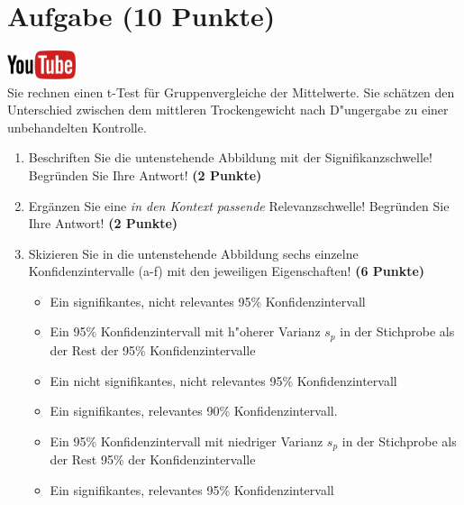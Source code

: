 \documentclass[a4paper, 9pt]{scrartcl}\usepackage[]{graphicx}\usepackage[]{xcolor}
\begin{document}
 
\clearpage

\section{Aufgabe \hfill (10 Punkte)}

\hfill\href{https://youtu.be/CN_O4fYPbhs}{\includegraphics[width =
  2cm]{img/youtube}}\\[1Ex]



Sie rechnen einen t-Test f{\"u}r Gruppenvergleiche der Mittelwerte. Sie
sch{\"a}tzen den Unterschied zwischen dem mittleren Trockengewicht nach D{"u}ngergabe zu einer unbehandelten
Kontrolle.

\begin{enumerate}
\item Beschriften Sie die untenstehende Abbildung mit der
  Signifikanzschwelle! Begr{\"u}nden Sie Ihre Antwort! \textbf{(2 Punkte)}
\item Erg{\"a}nzen Sie eine \textit{in den Kontext passende} Relevanzschwelle!
  Begr{\"u}nden Sie Ihre Antwort! \textbf{(2 Punkte)} 
\item Skizieren Sie in die
  untenstehende Abbildung sechs einzelne Konfidenzintervalle (a-f) mit den
  jeweiligen Eigenschaften! \textbf{(6 Punkte)}
  \begin{itemize}
  \item[(a)] Ein signifikantes, nicht relevantes 95\% Konfidenzintervall 	
  \item[(b)] Ein 95\% Konfidenzintervall mit h{"o}herer Varianz $s_p$ in der Stichprobe als der Rest der 95\% Konfidenzintervalle 	
  \item[(c)] Ein nicht signifikantes, nicht relevantes 95\% Konfidenzintervall 	
  \item[(d)] Ein signifikantes, relevantes 90\% Konfidenzintervall. 
  \item[(e)] Ein 95\% Konfidenzintervall mit niedriger Varianz $s_p$ in der Stichprobe als der Rest 95\% der Konfidenzintervalle
  \item[(f)] Ein signifikantes, relevantes 95\% Konfidenzintervall
  \end{itemize}
\end{enumerate}
\end{document}
